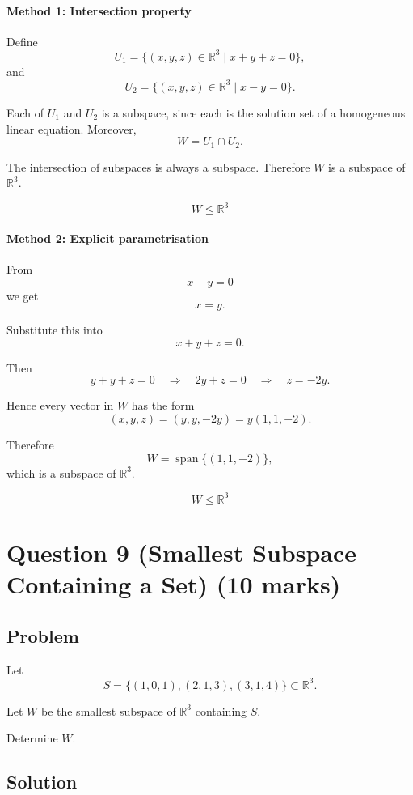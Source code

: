 \documentclass[12pt]{article}
\newcommand{\Span}{\operatorname{span}}
\begin{document}
\paragraph{Method 1: Intersection property}

Define
\[
U_1=\{(x,y,z)\in\mathbb R^3\mid x+y+z=0\},
\]
and
\[
U_2=\{(x,y,z)\in\mathbb R^3\mid x-y=0\}.
\]

Each of \(U_1\) and \(U_2\) is a subspace, since each is the solution set of a homogeneous linear equation. Moreover,
\[
W=U_1\cap U_2.
\]

The intersection of subspaces is always a subspace. Therefore \(W\) is a subspace of \(\mathbb R^3\).

\[
\boxed{W\le \mathbb R^3}
\]

\paragraph{Method 2: Explicit parametrisation}

From
\[
x-y=0
\]
we get
\[
x=y.
\]

Substitute this into
\[
x+y+z=0.
\]

Then
\[
y+y+z=0
\quad\Longrightarrow\quad
2y+z=0
\quad\Longrightarrow\quad
z=-2y.
\]

Hence every vector in \(W\) has the form
\[
(x,y,z)=(y,y,-2y)=y(1,1,-2).
\]

Therefore
\[
W=\Span\{(1,1,-2)\},
\]
which is a subspace of \(\mathbb R^3\).

\[
\boxed{W\le \mathbb R^3}
\]

\newpage
\section{Question 9 (Smallest Subspace Containing a Set) \hfill (10 marks)}
\subsection{Problem}

Let
\[
S=\{(1,0,1),(2,1,3),(3,1,4)\}\subset\mathbb R^3.
\]

Let \(W\) be the smallest subspace of \(\mathbb R^3\) containing \(S\).

Determine \(W\).

\subsection{Solution}
\end{document}

